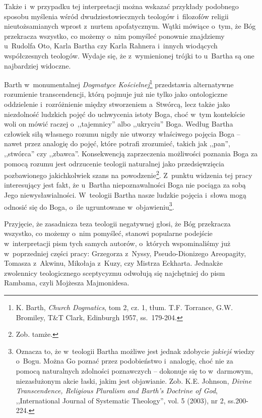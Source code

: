 
Także i~w przypadku tej interpretacji można wskazać przykłady podobnego sposobu myślenia wśród dwudziestowiecznych teologów i~filozofów religii nieutożsamianych wprost z~nurtem apofatycznym. Wątki mówiące o~tym, że Bóg przekracza wszystko, co możemy o~nim pomyśleć ponownie znajdziemy u~Rudolfa Oto, Karla Bartha czy Karla Rahnera i~innych wiodących współczesnych teologów. Wydaje się, że z~wymienionej trójki to u~Bartha są one najbardziej widoczne.

Barth w~monumentalnej \textit{Dogmatyce Kościelnej}\footnote{K. Barth, \textit{Church Dogmatics}, tom 2, cz. 1, tłum. T.F. Torrance, G.W. Bromiley, T\&T Clark, Edinburgh 1957, ss.~179-204.} przedstawia alternatywne rozumienie transcendencji, którą pojmuje już nie tylko jako ontologiczne oddzielenie i~rozróżnienie między stworzeniem a~Stwórcą, lecz także jako niezdolność ludzkich pojęć do uchwycenia istoty Boga, choć w~tym kontekście woli on mówić raczej o~,,tajemnicy'' albo ,,ukryciu'' Boga. Według Bartha człowiek siłą własnego rozumu nigdy nie utworzy właściwego pojęcia Boga -- nawet przez analogię do pojęć, które potrafi zrozumieć, takich jak ,,pan'', ,,stwórca'' czy ,,zbawca''. Konsekwencją zaprzeczenia możliwości poznania Boga za pomocą rozumu jest odrzucenie teologii naturalnej jako przedsięwzięcia pozbawionego jakichkolwiek szans na powodzenie\footnote{Zob. tamże.}. Z~punktu widzenia tej pracy interesujący jest fakt, że u~Bartha niepoznawalności Boga nie pociąga za sobą Jego niewysławialności. W~teologii Bartha nasze ludzkie pojęcia i~słowa mogą odnosić się do Boga, o~ile ugruntowane w~objawieniu\footnote{Oznacza to, że w~teologii Bartha możliwe jest jednak zdobycie \textit{jakiejś} wiedzy o~Bogu. Można Go poznać przez podobieństwo i~analogię, choć nie za pomocą naturalnych zdolności poznawczych -- dokonuje się to w~darmowym, niezasłużonym akcie łaski, jakim jest objawianie. Zob. K.E. Johnson, \textit{Divine Transcendence, Religious Pluralism and Barth's Doctrine of God}, ,,International Journal of Systematic Theology'', vol. 5 (2003), nr 2, ss.200-224.}.


Przyjęcie, że zasadnicza teza teologii negatywnej głosi, że Bóg przekracza wszystko, co możemy o~nim pomyśleć, stanowi popularne podejście w~interpretacji pism tych samych autorów, o~których wspominaliśmy już w~poprzedniej części pracy: Grzegorza z~Nyssy, Pseudo-Dionizego Areopagity, Tomasza z~Akwinu, Mikołaja z~Kuzy, czy Mistrza Eckharta. Jednakże zwolennicy teologicznego sceptycyzmu odwołują się najchętniej do pism Rambama, czyli Mojżesza Majmonidesa.

